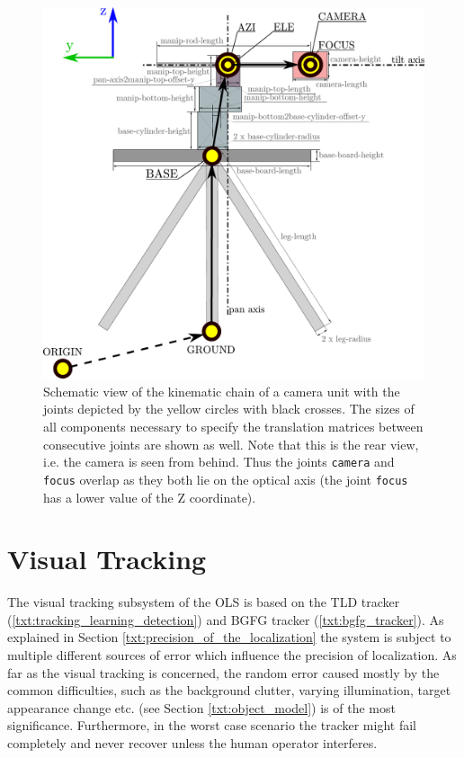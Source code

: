 \begin{figure}[htb]
	\centering
	\includegraphics[width=0.6\linewidth]{fig/camera_unit_kinematic_chain.pdf}
	\caption{Schematic view of the kinematic chain of a camera unit with the joints depicted by the yellow circles with black crosses. The sizes of all components necessary to specify the translation matrices between consecutive joints are shown as well. Note that this is the rear view, i.e. the camera is seen from behind. Thus the joints \texttt{camera} and \texttt{focus} overlap as they both lie on the optical axis (the joint \texttt{focus} has a lower value of the Z coordinate).}
	\label{fig:camera_unit_kinematic_chain}
\end{figure}


\section{Visual Tracking} \label{txt:visual_tracking}

The visual tracking subsystem of the OLS is based on the TLD tracker (\ref{txt:tracking_learning_detection}) and BGFG tracker (\ref{txt:bgfg_tracker}). As explained in Section \ref{txt:precision_of_the_localization} the system is subject to multiple different sources of error which influence the precision of localization. As far as the visual tracking is concerned, the random error caused mostly by the common difficulties, such as the background clutter, varying illumination, target appearance change etc. (see Section \ref{txt:object_model}) is of the most significance. Furthermore, in the worst case scenario the tracker might fail completely and never recover unless the human operator interferes.

